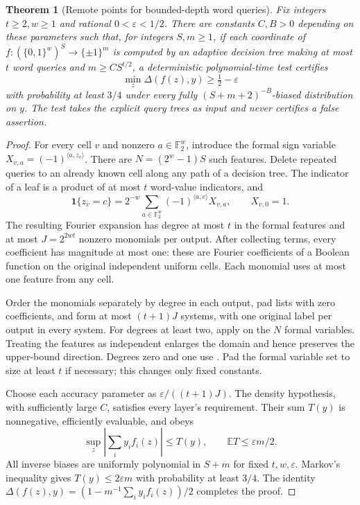 \documentclass[letterpaper,11pt]{article}
\newtheorem{theorem}{Theorem}
\theoremstyle{definition}
\newcommand{\F}{\mathbb F}
\newcommand{\E}{\mathbb E}
\begin{document}
\begin{theorem}[Remote points for bounded-depth word queries]
\label{thm:wordremote}
Fix integers $t\ge2,w\ge1$ and rational $0<\varepsilon<1/2$.
There are constants $C,B>0$ depending on these parameters such that,
for integers $S,m\ge1$, if each coordinate of
$f:(\{0,1\}^w)^S\to\{\pm1\}^m$ is computed by an adaptive
decision tree making at most $t$ word queries and
$m\ge CS^{t/2}$, a deterministic polynomial-time test certifies
\[
 \min_z\Delta(f(z),y)\ge\tfrac12-\varepsilon
\]
with probability at least $3/4$ under every fully
$(S+m+2)^{-B}$-biased distribution on $y$.
The test takes the explicit query trees as input and never certifies
a false assertion.
\end{theorem}
\begin{proof}
For every cell $v$ and nonzero $a\in\F_2^w$, introduce the formal
sign variable $X_{v,a}=(-1)^{\langle a,z_v\rangle}$.
There are $N=(2^w-1)S$ such features. Delete repeated queries to an
already known cell along any path of a decision tree. The indicator
of a leaf is a product of at most $t$ word-value indicators, and
\[
 \mathbf1\{z_v=c\}=2^{-w}
       \sum_{a\in\F_2^w}(-1)^{\langle a,c\rangle}X_{v,a},
 \qquad X_{v,0}=1.
\]
The resulting Fourier expansion has degree at most $t$ in the
formal features and at most $J=2^{2wt}$ nonzero monomials per output.
After collecting terms, every coefficient has magnitude at most one:
these are Fourier coefficients of a Boolean function on the original
independent uniform cells. Each monomial uses at most one feature
from any cell.

Order the monomials separately by degree in each output, pad lists
with zero coefficients, and form at most $(t+1)J$ systems, with one
original label per output in every system. For degrees at least two,
apply  on the $N$ formal variables. Treating the
features as independent enlarges the domain and hence preserves
the upper-bound direction. Degrees zero and one use
. Pad the formal variable set to size
at least $t$ if necessary; this changes only fixed constants.

Choose each accuracy parameter as
$\varepsilon/((t+1)J)$. The density hypothesis, with sufficiently
large $C$, satisfies every layer's requirement. Their sum $T(y)$
is nonnegative, efficiently evaluable, and obeys
\[
 \sup_z\left|\sum_i y_if_i(z)\right|\le T(y),
 \qquad \E T\le\varepsilon m/2.
\]
All inverse biases are uniformly polynomial in $S+m$ for fixed
$t,w,\varepsilon$. Markov's inequality gives
$T(y)\le2\varepsilon m$ with probability at least $3/4$.
The identity
$\Delta(f(z),y)=(1-m^{-1}\sum_i y_if_i(z))/2$
completes the proof.
\end{proof}
\end{document}

